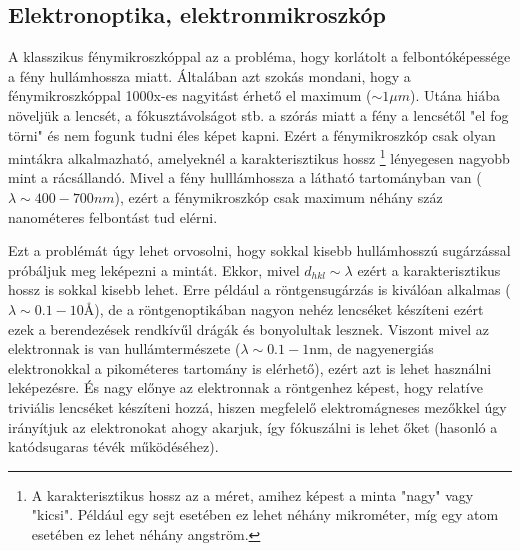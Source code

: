 \documentclass[../main.tex]{subfiles}
\begin{document}
\subsection{Elektronoptika, elektronmikroszkóp}
A klasszikus fénymikroszkóppal az a probléma, hogy korlátolt a felbontóképessége a fény hullámhossza miatt. Általában azt szokás mondani, hogy a fénymikroszkóppal 1000x-es nagyitást érhető el maximum ($\sim 1 \mu m$).
Utána hiába növeljük a lencsét, a fókusztávolságot stb. a szórás miatt a fény a lencsétől "el fog törni" és nem fogunk tudni éles képet kapni. Ezért a fénymikroszkóp csak olyan mintákra alkalmazható, amelyeknél a karakterisztikus hossz
\footnote{
    A karakterisztikus hossz az a méret, amihez képest a minta "nagy" vagy "kicsi". Például egy sejt esetében ez lehet néhány mikrométer, míg egy atom esetében ez lehet néhány angström.
} lényegesen nagyobb mint a rácsállandó. Mivel a fény hulllámhossza a látható tartományban van ($\lambda \sim 400-700 nm$), ezért a fénymikroszkóp csak maximum néhány száz nanométeres felbontást tud elérni.

Ezt a problémát úgy lehet orvosolni, hogy sokkal kisebb hullámhosszú sugárzással próbáljuk meg leképezni a mintát. Ekkor, mivel $d_{hkl} \sim \lambda$ ezért a karakterisztikus hossz is sokkal kisebb lehet. 
Erre például a röntgensugárzás is kiválóan alkalmas ($\lambda \sim 0.1-10 \text{\AA}$), de a röntgenoptikában nagyon nehéz lencséket készíteni ezért ezek a berendezések rendkívűl drágák és bonyolultak lesznek.
Viszont mivel az elektronnak is van hullámtermészete ($\lambda \sim 0.1 - 1 \text{nm}$, de nagyenergiás elektronokkal a pikométeres tartomány is elérhető), ezért azt is lehet használni leképezésre. És nagy előnye 
az elektronnak a röntgenhez képest, hogy relatíve triviális lencséket készíteni hozzá, hiszen megfelelő elektromágneses mezőkkel úgy irányítjuk az elektronokat ahogy akarjuk, így fókuszálni is lehet őket (hasonló a katódsugaras tévék működéséhez).
\end{document}
